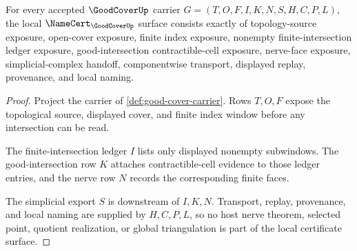 \begin{theorem}
\label{thm:good-cover-namecert-obligations}
For every accepted $\GoodCoverUp$ carrier $G=(T,O,F,I,K,N,S,H,C,P,L)$, the local $\NameCert_{\GoodCoverUp}$ surface consists exactly of topology-source exposure, open-cover exposure, finite index exposure, nonempty finite-intersection ledger exposure, good-intersection contractible-cell exposure, nerve-face exposure, simplicial-complex handoff, componentwise transport, displayed replay, provenance, and local naming.
\end{theorem}
\begin{proof}
Project the carrier of \autoref{def:good-cover-carrier}. Rows $T,O,F$ expose the topological source, displayed cover, and finite index window before any intersection can be read.

The finite-intersection ledger $I$ lists only displayed nonempty subwindows. The good-intersection row $K$ attaches contractible-cell evidence to those ledger entries, and the nerve row $N$ records the corresponding finite faces.

The simplicial export $S$ is downstream of $I,K,N$. Transport, replay, provenance, and local naming are supplied by $H,C,P,L$, so no host nerve theorem, selected point, quotient realization, or global triangulation is part of the local certificate surface.
\end{proof}

